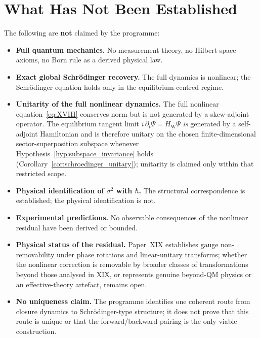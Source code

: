 \documentclass[12pt]{article}
\newcommand{\HW}{H_{\mathrm{W}}}
\begin{document}
\section{What Has Not Been Established}\label{sec:not}

The following are \textbf{not} claimed by the programme:

\begin{itemize}
    \item \textbf{Full quantum mechanics.} No measurement theory, no Hilbert-space axioms, no Born rule as a derived physical law.
    \item \textbf{Exact global Schr\"odinger recovery.} The full dynamics is nonlinear; the Schr\"odinger equation holds only in the equilibrium-centred regime.
    \item \textbf{Unitarity of the full nonlinear dynamics.} The full nonlinear equation~\eqref{eq:XVIII} conserves norm but is not generated by a skew-adjoint operator. The equilibrium tangent limit $i\,\partial_t\Psi = \HW\Psi$ \emph{is} generated by a self-adjoint Hamiltonian and is therefore unitary on the chosen finite-dimensional sector-superposition subspace whenever Hypothesis~\ref{hyp:subspace_invariance} holds (Corollary~\ref{cor:schroedinger_unitary}); unitarity is claimed only within that restricted scope.
    \item \textbf{Physical identification of $\sigma^2$ with $\hbar$.} The structural correspondence is established; the physical identification is not.
    \item \textbf{Experimental predictions.} No observable consequences of the nonlinear residual have been derived or bounded.
    \item \textbf{Physical status of the residual.} Paper~XIX establishes gauge non-removability under phase rotations and linear-unitary transforms; whether the nonlinear correction is removable by broader classes of transformations beyond those analysed in XIX, or represents genuine beyond-QM physics or an effective-theory artefact, remains open.
    \item \textbf{No uniqueness claim.} The programme identifies one coherent route from closure dynamics to Schr\"odinger-type structure; it does not prove that this route is unique or that the forward/backward pairing is the only viable construction.
\end{itemize}
\end{document}
